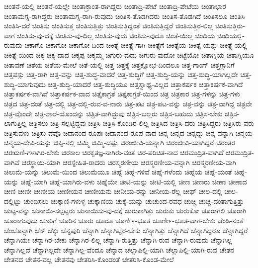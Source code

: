 {ಚಿಂತನೆ-ಯಲ್ಲಿ
ಚಿಂತನೆ-ಯಲ್ಲೇ
ಚಿಂತಾಕ್ರಾಂತ-ರಾಗಿದ್ದರು
ಚಿಂತಾದ್ರಿ-ಪೇಟೆ
ಚಿಂತಾದ್ರಿ-ಪೇಟೆಯ
ಚಿಂತಾಭಾರ
ಚಿಂತಾಮಗ್ನ-ರಾಗಿದ್ದರು
ಚಿಂತಾಮಗ್ನ-ರಾಗಿ-ರುವುದು
ಚಿಂತಿಸ-ತೊಡಗಿದರು
ಚಿಂತಿಸ-ತೊಡಗಿದೆ
ಚಿಂತಿಸಲೂ
ಚಿಂತಿಸಿ
ಚಿಂತಿಸಿ-ದರೆ
ಚಿಂತಿಸು
ಚಿಂತಿಸುತ್ತ
ಚಿಂತಿಸುತ್ತಿತ್ತು
ಚಿಂತಿಸುತ್ತಿದ್ದಂತೆ
ಚಿಂತಿಸುತ್ತಿದ್ದರೆ
ಚಿಂತಿಸುತ್ತಿರ-ಲಿಲ್ಲ
ಚಿಂತಿಸುತ್ತಿರು-ವಾಗ
ಚಿಂತಿಸು-ವು-ದಕ್ಕೆ
ಚಿಂತಿಸು-ವು-ದಿಲ್ಲ
ಚಿಂತಿಸು-ವುದು
ಚಿಂತಿಸು-ವುದೂ
ಚಿಂತೆ-ಯಿಲ್ಲ
ಚಿಂದಿಯ
ಚಿಂದಿಯಲ್ಲಿ-ರುವುದು
ಚಿಕಾಗೊ
ಚಿಕಾಗೋ
ಚಿಕಾಗೋ-ದಿಂದ
ಚಿಕಿತ್ಸೆ
ಚಿಕಿತ್ಸೆ-ಗಾಗಿ
ಚಿಕಿತ್ಸೆಗೆ
ಚಿಕಿತ್ಸೆಯ
ಚಿಕಿತ್ಸೆ-ಯನ್ನು
ಚಿಕಿತ್ಸೆ-ಯಲ್ಲಿ
ಚಿಕಿತ್ಸೆ-ಯಿಂದ
ಚಿಕ್ಕ
ಚಿಕ್ಕ-ದಾದ
ಚಿಕ್ಕಪ್ಪ
ಚಿಕ್ಕಮ್ಮ
ಚಿಗುರು-ವುದು
ಚಿಗುರು-ವುದೋ
ಚಿಟ್ಟೆಯೋ
ಚಿತಾಗ್ನಿಯ
ಚಿತಾಗ್ನಿಯೂ
ಚಿತಾವಣೆ
ಚಿತೆಯ
ಚಿತೆಯ-ಮೇಲೆ
ಚಿತೆ-ಯಲ್ಲಿ
ಚಿತ್ತ
ಚಿತ್ತಕ್ಕೆ
ಚಿತ್ತಕ್ಷೋಭ-ದಿಂದಲೂ
ಚಿತ್ತ-ಗಾಂಗ್
ಚಿತ್ತಗ್ಲಾನಿಗೆ
ಚಿತ್ತಪಸ್ಸು
ಚಿತ್ತ-ರಾಗಿ
ಚಿತ್ತ-ವನ್ನು
ಚಿತ್ತ-ಶುದ್ಧ-ವಾದರೆ
ಚಿತ್ತ-ಶುದ್ಧಿಗೆ
ಚಿತ್ತ-ಶುದ್ಧಿ-ಯನ್ನು
ಚಿತ್ತ-ಶುದ್ಧಿ-ಯಾಗಿಲ್ಲದೇ
ಚಿತ್ತ-ಶುದ್ಧಿ-ಯಾಗುವುದು
ಚಿತ್ತ-ಶುದ್ಧಿ-ಯಾದರೆ
ಚಿತ್ತ-ಶುದ್ಧಿಯೂ
ಚಿತ್ತಸ್ವಾಥ್ಯ-ವಿಲ್ಲದ
ಚಿತ್ತಾಕರ್ಷಕ
ಚಿತ್ತಾಕರ್ಷಕ-ವಾಗಿದೆ
ಚಿತ್ತಾಕರ್ಷಕ-ವಾಗಿವೆ
ಚಿತ್ತಾಕರ್ಷಕ-ವಾದ
ಚಿತ್ತೈಕಾಗ್ರತೆ
ಚಿತ್ತೈಕಾಗ್ರತೆ-ಯಿಂದ
ಚಿತ್ರ
ಚಿತ್ರಕಾರ
ಚಿತ್ರ-ಗಳನ್ನು
ಚಿತ್ರ-ಗಳು
ಚಿತ್ರದ
ಚಿತ್ರ-ದಂತೆ
ಚಿತ್ರ-ದಲ್ಲಿ
ಚಿತ್ರ-ದಲ್ಲಿ-ರುವ-ವ-ನಾರು
ಚಿತ್ರ-ಪಟ
ಚಿತ್ರ-ಪಟ-ವನ್ನು
ಚಿತ್ರ-ವನ್ನು
ಚಿತ್ರ-ವಾಗಿದ್ದ
ಚಿತ್ರವೇ
ಚಿತ್ರ-ವೊಂದೇ
ಚಿತ್ರ-ಶಾಲೆ-ಯೊಂದನ್ನು
ಚಿತ್ರಿತ-ವಾಗಿದ್ದುವು
ಚಿತ್ರಿಸ-ಬಲ್ಲರು
ಚಿತ್ರಿಸ-ಬಹುದು
ಚಿತ್ರಿಸ-ಬೇಕು
ಚಿತ್ರಿಸ-ಲಾಗುತ್ತಿಲ್ಲ
ಚಿತ್ರಿಸಲು
ಚಿತ್ರಿ-ಸಲ್ಪಟ್ಟಿದ್ದವು
ಚಿತ್ರಿಸಿ
ಚಿತ್ರಿಸಿ-ಕೊಂಡಿರ-ಲಿಲ್ಲ
ಚಿತ್ರಿಸಿದ
ಚಿತ್ರಿಸಿ-ದರು
ಚಿತ್ರಿಸಿದ್ದರು
ಚಿತ್ರಿಸಿರು-ವರು
ಚಿತ್ರಿಸುವಳು
ಚಿತ್ರಿಸು-ವೆವೊ
ಚಿದಾನಂದ-ರೂಪಃ
ಚಿದಾನಂದ-ರೂಪ-ನಾದ
ಚಿನ್ನ
ಚಿನ್ನದ
ಚಿನ್ನದ್ದು
ಚಿನ್ನ-ವನ್ನಾಗಿ
ಚಿನ್ಮಯ
ಚಿನ್ಮಯ-ದೇವಿ-ಯನ್ನು
ಚಿಪ್ಪಿ-ನಲ್ಲಿ
ಚಿಮ್ಮಿ
ಚಿಮ್ಮಿ-ದಷ್ಟು
ಚಿರಂಜೀವಿ-ಯನ್ನಾಗಿ
ಚಿರಂಜೀವಿ-ಯಾಗಿದ್ದರೆ
ಚಿರಂತರ
ಚಿರಋಣಿ-ಗಳಾಗಿರ-ಬೇಕು
ಚಿರಕಾಲ
ಚಿರಕೃತಜ್ಞ-ನಾಗಿರು-ವಂತೆ
ಚಿರ-ಪರಿಚಿತ-ನಾದ
ಚಿರಮುದ್ರಿತ-ವಾಗಿದೆ
ಚಿರಮುದ್ರಿತ-ವಾಗಿವೆ
ಚಿರಸ್ಥಾಯಿ-ಯಾಗಿ
ಚಿರಸ್ನೇಹಿತ-ರಾದರು
ಚಿರಸ್ಮರಣೀಯ
ಚಿರಸ್ಮರಣೀಯ-ವನ್ನಾಗಿ
ಚಿರಸ್ಮರಣೀಯ-ವಾಗಿ
ಚಿಲುಮೆ-ಯನ್ನು
ಚಿಲುಮೆ-ಯಿಂದ
ಚಿಲುಮೆಯೂ
ಚಿಹ್ನೆ
ಚಿಹ್ನೆ-ಗಳಿವೆ
ಚಿಹ್ನೆ-ಗಳೆಂದು
ಚಿಹ್ನೆಯ
ಚಿಹ್ನೆ-ಯಂತೆ
ಚಿಹ್ನೆ-ಯನ್ನು
ಚಿಹ್ನೆ-ಯಾಗಿ
ಚಿಹ್ನೆ-ಯಾಗಿರು-ವಳು
ಚಿಹ್ನೆಯೇ
ಚೀಟಿ-ಯನ್ನು
ಚೀಟಿ-ಯಲ್ಲಿ
ಚೀಣ
ಚೀಣರು
ಚೀಣಾ
ಚೀಣಾದ
ಚೀಣಿ
ಚೀಣೀ
ಚೀಣೀಯ
ಚೀಣೀಯನ
ಚೀಣೀಯನು
ಚೀನೀಯ-ರನ್ನು
ಚೀನೀಯ-ರೆಲ್ಲ
ಚೀಫ್
ಚೀಲ-ದಲ್ಲಿ
ಚೀಲ-ದಲ್ಲಿಟ್ಟು
ಚುಂಬಿಸಲು
ಚುಕ್ಕಾಣಿ-ಗಳುಳ್ಳ
ಚುಕ್ಕಾಣಿಯ
ಚುಕ್ಕೆ-ಯನ್ನು
ಚುಚುಂದ-ರವಧ
ಚುಚ್ಚಿ
ಚುಚ್ಚಿ-ದಂತಾಗುತ್ತಿತ್ತು
ಚುಟ್ಟ-ವನ್ನು
ಚುನಾಯಿ-ಸಲ್ಪಟ್ಟರು
ಚುನಾಯಿಸು-ವು-ದಕ್ಕೆ
ಚುರುಕಾಗಿತ್ತು
ಚುರುಕು
ಚುರುಕೋ
ಚೂರಾಗಲಿ
ಚೂರಾಗಿ
ಚೂರಾಗುವುದು
ಚೂರಿಗೆ
ಚೂರಿನ
ಚೂರು
ಚೂರೂ
ಚೂರ್ಣೀ-ಭೂತ
ಚೂರ್ಣೀ-ಭೂತ-ವಾಗ-ಬೇಕು
ಚೆಂಡಿ-ನಂತೆ
ಚೆಂಬೊನ್ನಾಗಿ
ಚೆಕ್
ಚೆಕ್ಕು
ಚೆನ್ನಪುರಿ
ಚೆನ್ನಾಗಿ
ಚೆನ್ನಾಗಿಟ್ಟಿರ-ಬೇಕು
ಚೆನ್ನಾಗಿತ್ತು
ಚೆನ್ನಾಗಿದೆ
ಚೆನ್ನಾಗಿದ್ದರೂ
ಚೆನ್ನಾಗಿದ್ದರೆ
ಚೆನ್ನಾಗಿಯೇ
ಚೆನ್ನಾಗಿರ-ಬೇಕು
ಚೆನ್ನಾಗಿರ-ಲಿಲ್ಲ
ಚೆನ್ನಾಗಿ-ರುತ್ತಿತ್ತು
ಚೆನ್ನಾಗಿ-ರುವ
ಚೆನ್ನಾಗಿ-ರುವುದು
ಚೆನ್ನಾಗಿಲ್ಲ
ಚೆನ್ನಾಗಿಲ್ಲದೆ
ಚೆನ್ನಾಗಿಲ್ಲದೇ
ಚೆನ್ನಾಗಿಲ್ಲ-ವೆಂದೂ
ಚೆನ್ನಾದ
ಚೆಲ್ಲಾಪಿಲ್ಲಿ-ಯಾಗಿ
ಚೆಲ್ಲಾಪಿಲ್ಲಿ-ಯಾಗಿ-ರುವ
ಚೇತನ
ಚೇತನದ
ಚೇತನ-ವಲ್ಲ
ಚೇತನವು
ಚೇತರಿಸಿ-ಕೊಂಡಂತೆ
ಚೇತರಿಸಿ-ಕೊಂಡ-ಮೇಲೆ
}
